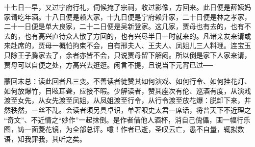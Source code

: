 \begin{parag}
    十七日一早，又过宁府行礼，伺候掩了宗祠，收过影像，方回来。此日便是薛姨妈家请吃年酒。十八日便是赖大家，十九日便是宁府赖升家，二十日便是林之孝家，二十一日便是单大良家，二十二日便是吴新登家。这几家，贾母也有去的，也有不去的，也有高兴直待众人散了方回的，也有兴尽半日一时就来的。凡诸亲友来请或来赴席的，贾母一概怕拘束不会，自有邢夫人、王夫人、凤姐儿三人料理。连宝玉只除王子腾家去了，余者亦皆不会，只说贾母留下解闷。所以倒是家下人家来请，贾母可以自便之处，方高兴去逛逛。闲言不提，且说当下元宵已过──
\end{parag}


\begin{parag}
    \begin{note}蒙回末总：读此回者凡三变。不善读者徒赞其如何演戏、如何行令、如何挂花灯、如何放爆竹，目眩耳聋，应接不暇。少解读者，赞其座次有伦、巡酒有度，从演戏渡至女先，从女先渡至凤姐，从凤姐渡至行令，从行令渡至放花爆：脱卸下来，井然秩然，一丝不乱。会读者须另具卓识，单著眼史太君一席话，将普天下不近理之 “奇文”、不近情之“妙作”一起抹倒。是作者借他人酒杯，消自己傀儡，画一幅行乐图，铸一面菱花镜，为全部总评。噫！作者已逝，圣叹云亡，愚不自量，辄拟数语，知我罪我，其听之矣。\end{note}
\end{parag}

